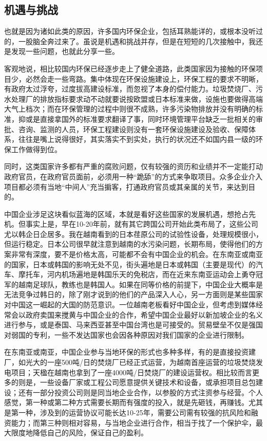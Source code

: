 \documentclass[
]{book}
\begin{document}
\hypertarget{ux673aux9047ux4e0eux6311ux6218}{%
\subsection{机遇与挑战}\label{ux673aux9047ux4e0eux6311ux6218}}

也就是因为诸如此类的原因，许多国内环保企业，包括耳熟能详的，或根本没听过的，一股脑全奔过来了。虽说是机遇和挑战并存，但是在短短的几次接触中，我还是发现一些问题，也就此分享一些。

客观地说，相比较国内环保已经逐步走上了健全道路，此类国家因为接触的环保项目少，必然会走一些弯路。集中体现在环保设施建设上，环保工程的要求不明晰，有政府太过浮夸，过度拔高建设标准，而忽视了本身的偿付能力。垃圾焚烧厂、污水处理厂的排放指标要求动不动就要说按欧盟或日本标准来做，设施也要做得高端大气上档次；而在环保管理的过程中则很不成熟，许多污染物排放并没有明确的标准，抑或是直接拿国外的标准要求翻译了事，同时环境管理平台缺乏一批相关的审批、咨询、监测的人员，环保工程建设则没有一套环保设施建设及验收、保障体系，往往是嘴上说得很好，其实落实不到实处，执行的状况还不如国内县一级的环保工作做得到位。

同时，这类国家许多都有严重的腐败问题，仅有较强的资历和业绩并不一定能打动政府官员，在政府官员面前，必须用一种``跪舔''的方式来争取项目。众多企业介入项目都必须有当地``中间人''充当掮客，打通政府官员或其亲属的关节，来达到目的。

中国企业涉足这块看似蓝海的区域，本就是看好这些国家的发展机遇，想抢占先机。但事实上是，早在10-20年前，就有其它跨国公司开始此类布局了，这些公司尤以韩企日企居多。我在越南看到的日本荏原公司的试验性设备，处理规模很小，但运行稳定。日本公司很早就注意到越南的水污染问题，长期布局，使得他们的方案非常有深度，要不是价格太高，可能都不会有中国企业的机会。在东南亚或南亚的国家，日本或韩国的影响无处不见，街头遍地是日本或韩国（主要是现代）的汽车、摩托车，河内机场遍地是韩国乐天的免税店，而在近来东南亚运动会上勇夺冠军的越南足球队，教练也是韩国人。如果在同等价格的前提下，中国企业大概率是无法竞争过韩日的，除了刚才说到的他们的产品深入人心，另一方面则是某些国家对中国这一崛起的大国的防范意识。一位越南老板看好中国企业，但考虑到媒体经常会以政府卖国来搅黄与中国企业的合作，希望中国企业最好以新加坡企业的名义进行参与，或是泰国、马来西亚甚至中国台湾也是可接受的。贸易壁垒不仅是强国对弱国的专利，一些不发达国家也会因各种原因对我们国家的企业进行限制。

在东南亚或南亚，中国企业参与当地环保的形式也多种多样，有的是直接投资建厂，如光大的一座500吨/日的焚烧厂已经正式运营，为越南首座运营的垃圾焚烧发电项目；天楹在越南也拿到了一座4000吨/日焚烧厂的建设运营权。相比较而言更多的则是，一些设备厂家或工程公司愿意提供关键技术和设备，或承担项目总包建设；还有一部分投资公司则是同当地企业合作，以参股的方式注资参与经营。个人感觉，第一种或第二种方式需要长期而有强度的投入，就是先砸钱，再赚钱。尤其是第一种，涉及到的运营协议可能长达10-25年，需要公司需有较强的抗风险和融资能力；而第三种则相对容易，与当地企业进行合作，相当于找了一个保护伞，最大限度地降低自己的风险，保证自己的盈利。
\end{document}
